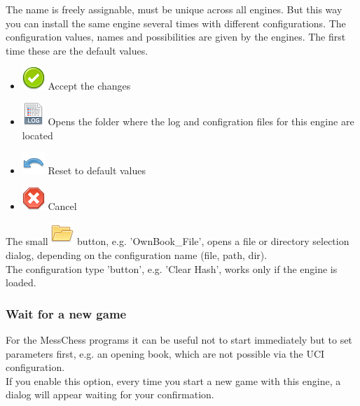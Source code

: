 \documentclass[11pt,a4paper]{article}
\begin{document}
	The name is freely assignable, must be unique across all engines. But this way you can install the same engine several times with different configurations. The configuration values, names and possibilities are given by the engines. The first time these are the default values.
	\begin{itemize}
		\item \includegraphics[scale=0.5]{accept_button.png} Accept the changes
		\item \includegraphics[scale=0.5]{file_extension_log.png} Opens the folder where the log and configration files for this engine are located
		\item \includegraphics[scale=0.5]{undo.png} Reset to default values
		\item \includegraphics[scale=0.5]{cancel.png} Cancel
	\end{itemize}
	The small \includegraphics[scale=0.3]{folder.png} button, e.g. 'OwnBook\_File', opens a file or directory selection dialog, depending on the configuration name (file, path, dir).\\
	The configuration type 'button', e.g. 'Clear Hash', works only if the engine is loaded.
	
	\subsubsection{Wait for a new game} \label{WaitForANewgame}
	For the MessChess programs it can be useful not to start immediately but to set parameters first, e.g. an opening book, which are not possible via the UCI configuration.\\
	If you enable this option, every time you start a new game with this engine, a dialog will appear waiting for your confirmation.
	
\end{document}
